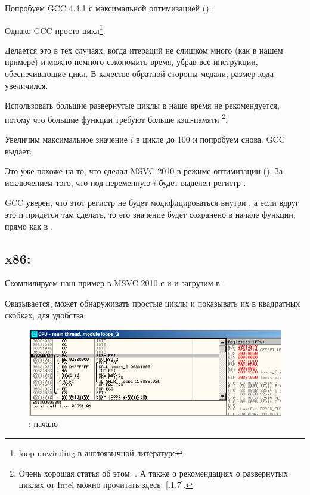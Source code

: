 Попробуем GCC 4.4.1 с максимальной оптимизацией (\Othree):



Однако GCC просто  цикл\footnote{\gls{loop unwinding} в англоязычной литературе}.

Делается это в тех случаях, когда итераций не слишком много (как в нашем примере)
и можно немного сэкономить время, убрав все инструкции, обеспечивающие цикл. 
В качестве обратной стороны медали, размер кода увеличился.

Использовать большие развернутые циклы в наше время не рекомендуется, потому что большие
функции требуют больше кэш-памяти%
\footnote{Очень хорошая статья об этом: \DrepperMemory.
А также о рекомендациях о развернутых циклах от Intel можно прочитать здесь: 
[.1.7].}.

Увеличим максимальное значение $i$ в цикле до 100 и попробуем снова. GCC выдает:



Это уже похоже на то, что сделал MSVC 2010 в режиме оптимизации (\TT{\Ox}).
За исключением того, что под переменную $i$ будет выделен регистр \EBX.

GCC уверен, что этот регистр не будет 
модифицироваться внутри \ttf, а если вдруг это и придётся там сделать, то его значение будет сохранено 
в начале функции, прямо как в \main.

\clearpage
\subsection{x86: \olly}
\myindex{\olly}

Скомпилируем наш пример в MSVC 2010 с \Ox и \Obzero и загрузим в \olly.

Оказывается, \olly может обнаруживать простые циклы и показывать их в квадратных скобках, 
для удобства:

\begin{figure}[H]
\centering
\includegraphics[scale=\FigScale]{patterns/09_loops/simple/olly1.png}
\caption{\olly: начало \main}
\label{fig:loops_olly_1}
\end{figure}

